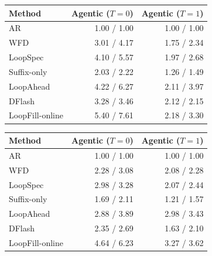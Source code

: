 \begin{tabular}{lrr}
\hline
Method & Agentic ($T=0$) & Agentic ($T=1$) \\
\hline
AR & 1.00 / 1.00 & 1.00 / 1.00 \\
WFD & 3.01 / 4.17 & 1.75 / 2.34 \\
LoopSpec & 4.10 / 5.57 & 1.97 / 2.68 \\
Suffix-only & 2.03 / 2.22 & 1.26 / 1.49 \\
LoopAhead & 4.22 / 6.27 & 2.11 / 3.97 \\
DFlash & 3.28 / 3.46 & 2.12 / 2.15 \\
LoopFill-online & 5.40 / 7.61 & 2.18 / 3.30 \\
\hline
\end{tabular}

\begin{tabular}{lrr}
\hline
Method & Agentic ($T=0$) & Agentic ($T=1$) \\
\hline
AR & 1.00 / 1.00 & 1.00 / 1.00 \\
WFD & 2.28 / 3.08 & 2.08 / 2.28 \\
LoopSpec & 2.98 / 3.28 & 2.07 / 2.44 \\
Suffix-only & 1.69 / 2.11 & 1.21 / 1.57 \\
LoopAhead & 2.88 / 3.89 & 2.98 / 3.43 \\
DFlash & 2.35 / 2.69 & 1.63 / 2.10 \\
LoopFill-online & 4.64 / 6.23 & 3.27 / 3.62 \\
\hline
\end{tabular}

